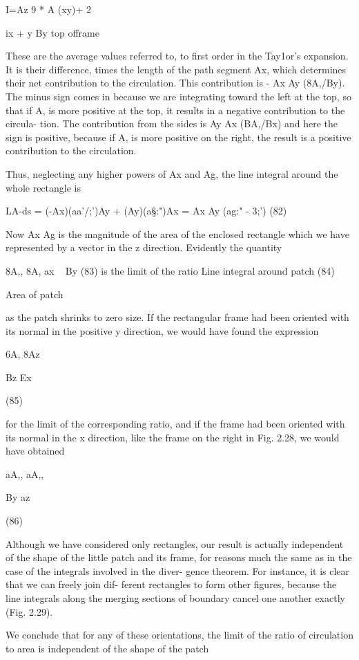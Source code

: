 I=Az 9 *
A (xy)+ 2 {ix + y By top offrame

These are the average values referred to, to first order in the Tay1or's
expansion. It is their difference, times the length of the path segment
Ax, which determines their net contribution to the circulation. This
contribution is - Ax Ay (8A,/By). The minus sign comes in because
we are integrating toward the left at the top, so that if A, is more
positive at the top, it results in a negative contribution to the circula-
tion. The contribution from the sides is Ay Ax (BA,/Bx) and here
the sign is positive, because if A, is more positive on the right, the
result is a positive contribution to the circulation.

 

Thus, neglecting any higher powers of Ax and Ag, the line integral
around the whole rectangle is

LA-ds = (-Ax)(aa'/;')Ay + (Ay)(a§:")Ax
= Ax Ay (ag:" - 3;') (82)

Now Ax Ag is the magnitude of the area of the enclosed rectangle
which we have represented by a vector in the z direction. Evidently
the quantity

8A,, 8A,
ax ~ By (83)
is the limit of the ratio
Line integral around patch (84)

Area of patch

as the patch shrinks to zero size. If the rectangular frame had been
oriented with its normal in the positive y direction, we would have
found the expression

6A, 8Az

Bz Ex

(85)

for the limit of the corresponding ratio, and if the frame had been
oriented with its normal in the x direction, like the frame on the right
in Fig. 2.28, we would have obtained

aA,, aA,,

By az

(86)

Although we have considered only rectangles, our result is actually
independent of the shape of the little patch and its frame, for reasons
much the same as in the case of the integrals involved in the diver-
gence theorem. For instance, it is clear that we can freely join dif-
ferent rectangles to form other figures, because the line integrals
along the merging sections of boundary cancel one another exactly
(Fig. 2.29).

We conclude that for any of these orientations, the limit of the
ratio of circulation to area is independent of the shape of the patch

}
